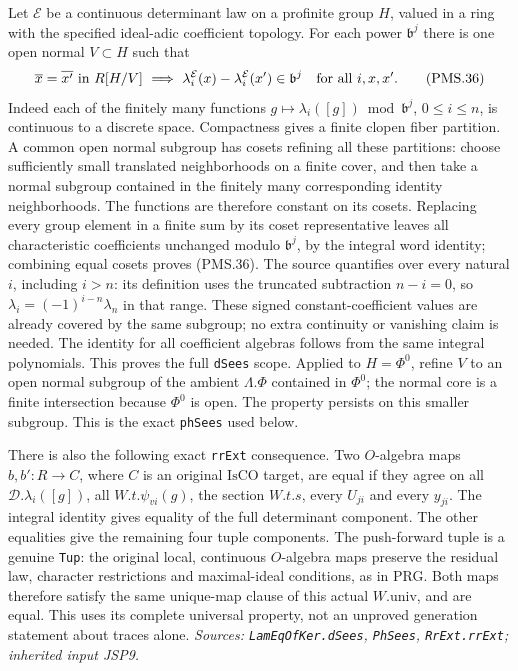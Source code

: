 Let $\mathcal E$ be a continuous determinant law on a profinite
group $H$, valued in a ring with the specified ideal-adic
coefficient topology.  For each power $\mathfrak b^j$ there is
one open normal $V\subset H$ such that
\[
 \overline{x}=\overline{x'}\text{ in }R[H/V]
 \ \Longrightarrow\
 \lambda_i^{\mathcal E}(x)-\lambda_i^{\mathcal E}(x')
      \in\mathfrak b^j\quad\hbox{for all }i,x,x'.             \tag{PMS.36}
\]
Indeed each of the finitely many functions
$g\mapsto\lambda_i([g])\bmod\mathfrak b^j$, $0\leq i\leq n$,
is continuous to a discrete space.  Compactness gives a finite
clopen fiber partition.  A common open normal subgroup has
cosets refining all these partitions: choose sufficiently small
translated neighborhoods on a finite cover, and then take a
normal subgroup contained in the finitely many corresponding
identity neighborhoods.  The functions are therefore constant
on its cosets.  Replacing every group element in a finite sum
by its coset representative leaves all characteristic
coefficients unchanged modulo $\mathfrak b^j$, by the integral
word identity; combining equal cosets proves (PMS.36).
The source quantifies over every natural $i$, including $i>n$:
its definition uses the truncated subtraction $n-i=0$, so
$\lambda_i=(-1)^{i-n}\lambda_n$ in that range.  These signed
constant-coefficient values are already covered by the same
subgroup; no extra continuity or vanishing claim is needed.
The identity for all coefficient algebras follows from the same
integral polynomials.  This proves the full \texttt{dSees}
scope.  Applied to $H=\Phi^0$, refine $V$ to an open normal
subgroup of the ambient $\Lambda.\Phi$ contained in $\Phi^0$;
the normal core is a finite intersection because $\Phi^0$ is
open.  The property persists on this smaller subgroup.  This
is the exact \texttt{phSees} used below.

There is also the following exact \texttt{rrExt} consequence.
Two $O$-algebra maps $b,b':R\to C$, where $C$ is an original
$\mathrm{IsCO}$ target, are equal if they agree on all
$\mathcal D.\lambda_i([g])$, all $W.t.\psi_{vi}(g)$, the
section $W.t.s$, every $U_{ji}$ and every $y_{ji}$.
The integral identity gives equality of the full determinant
component.  The other equalities give the remaining four tuple
components.  The push-forward tuple is a genuine \texttt{Tup}:
the original local, continuous $O$-algebra maps preserve the
residual law, character restrictions and maximal-ideal
conditions, as in PRG.  Both maps therefore satisfy the same
unique-map clause of this actual $W.\mathrm{univ}$, and are
equal.  This uses its complete universal property, not an
unproved generation statement about traces alone.
\hfill\textit{Sources: \texttt{LamEqOfKer.dSees}, \texttt{PhSees},
\texttt{RrExt.rrExt}; inherited input JSP9.}

